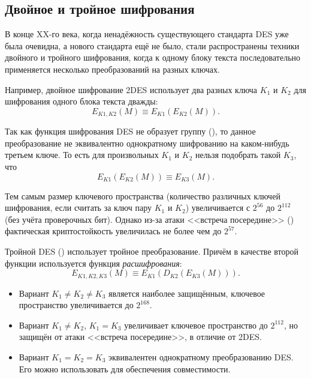 \subsection{Двойное и тройное шифрования}

В конце XX-го века, когда ненадёжность существующего стандарта DES уже была очевидна, а нового стандарта ещё не было, стали распространены техники двойного и тройного шифрования, когда к одному блоку текста последовательно применяется несколько преобразований на разных ключах.

Например, двойное шифрование 2DES использует два разных ключа $K_1$ и $K_2$ для шифрования одного блока текста дважды:
\[ E_{K1, K2} \left( M \right) \equiv E_{K1} \left( E_{K2} \left( M \right) \right). \]

Так как функция шифрования DES не образует группу (\cite{Kaliski:Rivest:Sherman:1988, Campbell:Wiener:1993}), то данное преобразование не эквивалентно однократному шифрованию на каком-нибудь третьем ключе. То есть для произвольных $K_1$ и $K_2$ нельзя подобрать такой $K_3$, что
\[E_{K1} \left( E_{K2} \left( M \right) \right) \equiv E_{K3} \left( M \right).\]

Тем самым размер ключевого пространства (количество различных ключей шифрования, если считать за ключ пару $K_1$ и $K_2$) увеличивается с $2^{56}$ до $2^{112}$ (без учёта проверочных бит). Однако из-за атаки <<встреча посередине>> () фактическая криптостойкость увеличилась не более чем до $2^{57}$.

Тройной DES () использует тройное преобразование. Причём в качестве второй функции используется функция \emph{расшифрования}:
\[ E_{K1, K2, K3} \left( M \right) \equiv E_{K1} \left( D_{K2} \left( E_{K3} \left( M \right) \right) \right). \]

\begin{itemize}
	\item Вариант $K_1 \neq K_2 \neq K_3$ является наиболее защищённым, ключевое пространство увеличивается до $2^{168}$.
	\item Вариант $K_1 \neq K_2$, $K_1 = K_3$ увеличивает ключевое пространство до $2^{112}$, но защищён от атаки <<встреча посередине>>, в отличие от 2DES.
	\item Вариант $K_1 = K_2 = K_3$ эквивалентен однократному преобразованию DES. Его можно использовать для обеспечения совместимости.
\end{itemize}

